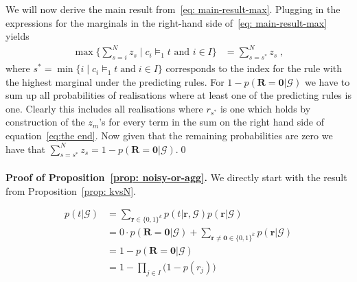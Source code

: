 \documentclass{article}
\theoremstyle{plain}
\theoremstyle{remark}
\newcommand{\atomrule}{c}
\newcommand{\vecallfiredrules}{\mathbf{r}}
\newcommand{\alltriples}{\mathcal{G}}
\newcommand{\indexSetFired}{I}
\begin{document}
We will now derive the main result from~\eqref{eq: main-result-max}. Plugging in the expressions for the marginals in the right-hand side of~\eqref{eq: main-result-max} yields
\begin{align}
    \max \big\{\sum_{s=i}^{N}z_s \; \big| \; \atomrule_i \models_1 t \textrm{ and } i \in \indexSetFired  \big\} &=  \label{eq:the end}
       \sum_{s=s^*}^{N}z_s \;,
\end{align}
\noindent  where $s^* = \min \{i \;|\; \atomrule_i \models_1 t \; \textrm{and} \; i \in \indexSetFired\}$ corresponds to the index for the rule with the highest marginal under the predicting rules. For $1-p(\mathbf{R}{=}\mathbf{0} | \alltriples)$ we have to sum up all probabilities of realisations where at least one of the predicting rules is one. Clearly this includes all realisations where $r_{s^*}$ is one which holds by construction of the $z_m$'s for every term in the sum on the right hand side of equation~\eqref{eq:the end}. Now given that the remaining probabilities are zero we have that  $\sum_{s=s^*}^{N}z_s = 1-p(\mathbf{R}=\mathbf{0} | \alltriples). $\qed \\
\\
\noindent\textbf{Proof of Proposition~\ref{prop: noisy-or-agg}.} We directly start with the result from Proposition~\ref{prop: kvsN}.




\begin{align*}
    p(t | \alltriples) &= \sum_{\vecallfiredrules \in \{0,1\}^k}  p(t |  \vecallfiredrules, \alltriples)p(\vecallfiredrules | \alltriples)  \\
    &=  0 \cdot p(\mathbf{R}=\mathbf{0} | \alltriples) +  \sum_{\vecallfiredrules \neq \mathbf{0} \in \{0,1\}^k} p(\vecallfiredrules | \alltriples)  \\
     &= 1 - p(\mathbf{R}=\mathbf{0} |\alltriples)\\
    &= 1-\prod_{j \in \indexSetFired} \big(1-p(r_j)\big) \tag*{\qed}
\end{align*}
\\
\end{document}
